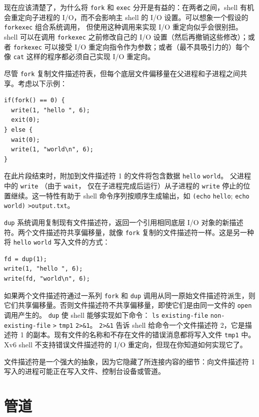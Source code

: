 现在应该清楚了，为什么将
\lstinline{fork}
和
\lstinline{exec}
分开是有益的：在两者之间，shell 有机会重定向子进程的 I/O，而不会影响主 shell 的 I/O 设置。可以想象一个假设的
\lstinline{forkexec} 组合系统调用，
但使用这种调用来实现 I/O 重定向似乎会很别扭。shell 可以在调用 \lstinline{forkexec} 之前修改自己的 I/O 设置（然后再撤销这些修改）；或者
\lstinline{forkexec}
可以接受 I/O 重定向指令作为参数；或者（最不具吸引力的）每个像 \lstinline{cat} 这样的程序都必须自己实现 I/O 重定向。

尽管
\lstinline{fork}
复制文件描述符表，但每个底层文件偏移量在父进程和子进程之间共享。考虑以下示例：
\begin{lstlisting}[]
if(fork() == 0) {
  write(1, "hello ", 6);
  exit(0);
} else {
  wait(0);
  write(1, "world\n", 6);
}
\end{lstlisting}
在此片段结束时，附加到文件描述符 1 的文件将包含数据
\lstinline{hello}
\lstinline{world}。
父进程中的
\lstinline{write}
（由于
\lstinline{wait}，
仅在子进程完成后运行）从子进程的
\lstinline{write}
停止的位置继续。这一特性有助于 shell 命令序列按顺序生成输出，如
\lstinline{(echo}
\lstinline{hello};
\lstinline{echo}
\lstinline{world)}
\lstinline{>output.txt}。

\lstinline{dup}
系统调用复制现有文件描述符，返回一个引用相同底层 I/O 对象的新描述符。两个文件描述符共享偏移量，就像
\lstinline{fork}
复制的文件描述符一样。这是另一种将
\lstinline{hello}
\lstinline{world}
写入文件的方式：
\begin{lstlisting}[]
fd = dup(1);
write(1, "hello ", 6);
write(fd, "world\n", 6);
\end{lstlisting}

如果两个文件描述符通过一系列
\lstinline{fork}
和
\lstinline{dup}
调用从同一原始文件描述符派生，则它们共享偏移量。否则文件描述符不共享偏移量，即使它们是由同一文件的
\lstinline{open}
调用产生的。
\lstinline{dup}
使 shell 能够实现如下命令：
\lstinline{ls}
\lstinline{existing-file}
\lstinline{non-existing-file}
\lstinline{>}
\lstinline{tmp1}
\lstinline{2>&1}。
\lstinline{2>&1}
告诉 shell 给命令一个文件描述符 2，它是描述符 1 的副本。现有文件的名称和不存在文件的错误消息都将写入文件
\lstinline{tmp1}
中。Xv6 shell 不支持错误文件描述符的 I/O 重定向，但现在你知道如何实现它了。

文件描述符是一个强大的抽象，因为它隐藏了所连接内容的细节：向文件描述符 1 写入的进程可能正在写入文件、控制台设备或管道。
\section{管道}


